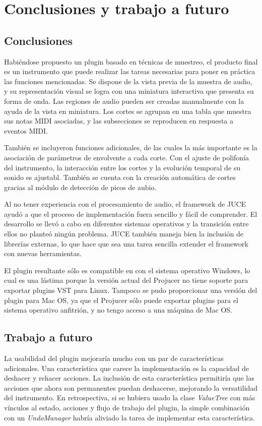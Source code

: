 \documentclass[12pt, a4paper, hidelinks]{report}
\begin{document}
	\chapter{Conclusiones y trabajo a futuro}
	\section{Conclusiones}
	Habiéndose propuesto un plugin basado en técnicas de muestreo, el producto final es un instrumento que puede realizar las tareas necesarias para poner en práctica las funciones mencionadas. Se dispone de la vista previa de la muestra de audio, y su representación visual se logra con una miniatura interactiva que presenta su forma de onda. Las regiones de audio pueden ser creadas manualmente con la ayuda de la vista en miniatura. Los cortes se agrupan en una tabla que muestra sus notas MIDI asociadas, y las subsecciones se reproducen en respuesta a eventos MIDI.\par
	
	También se incluyeron funciones adicionales, de las cuales la más importante es la asociación de parámetros de envolvente a cada corte. Con el ajuste de polifonía del instrumento, la interacción entre los cortes y la evolución temporal de su sonido es ajustabl. También se cuenta con la creación automática de cortes gracias al módulo de detección de picos de aubio.\par
	
	Al no tener experiencia con el procesamiento de audio, el framework de JUCE ayudó a que el proceso de implementación fuera sencillo y fácil de comprender. El desarrollo se llevó a cabo en diferentes sistemas operativos y la transición entre ellos no planteó ningún problema. JUCE también maneja bien la inclusión de librerías externas, lo que hace que sea una tarea sencilla extender el framework con nuevas herramientas.\par 
	
	El plugin resultante sólo es compatible en con el sistema operativo Windows, lo cual es una lástima porque la versión actual del Projucer no tiene soporte para exportar plugins VST para Linux. Tampoco se pudo proporcionar una versión del plugin para Mac OS, ya que el Projucer sólo puede exportar plugins para el sistema operativo anfitrión, y no tengo acceso a una máquina de Mac OS. \par
	
	
	\section{Trabajo a futuro}	
	La usabilidad del plugin mejoraría mucho con un par de características adicionales. Una característica que carece la implementación es la capacidad de deshacer y rehacer acciones. La inclusión de esta característica permitiría que las acciones que ahora son permanentes puedan deshacerse, mejorando la versatilidad del instrumento. En retrospectiva, si se hubiera usado la clase \textit{ValueTree} con más vínculos al estado, acciones y flujo de trabajo del plugin, la simple combinación con un \textit{UndoManager} habría aliviado la tarea de implementar esta característica.\par
	
\end{document}
